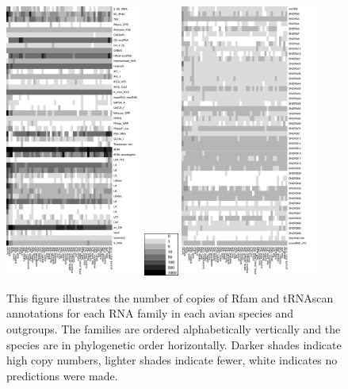 \documentclass[10pt]{bmc_article}
\newenvironment{bmcformat}{\begin{raggedright}\baselineskip20pt\sloppy\setboolean{publ}{false}}{\end{raggedright}\baselineskip20pt\sloppy}
\begin{document}
\begin{bmcformat}
\begin{figure}[ht]
  \includegraphics[width=0.4\textwidth]{figures/RNA.pdf}
  \includegraphics[width=0.1\textwidth]{figures/key2.pdf}
  \includegraphics[width=0.4\textwidth]{figures/snoRNA-human-yeast-correspondences.pdf}
  \caption[]{This figure illustrates the number of copies of Rfam and
    tRNAscan annotations for each RNA family in each avian species and
    outgroups. The families are ordered alphabetically vertically and
    the species are in phylogenetic order horizontally. Darker shades
    indicate high copy numbers, lighter shades indicate fewer, white
    indicates no predictions were made.}\label{fig:1}
\end{figure}



\end{bmcformat}
\end{document}
